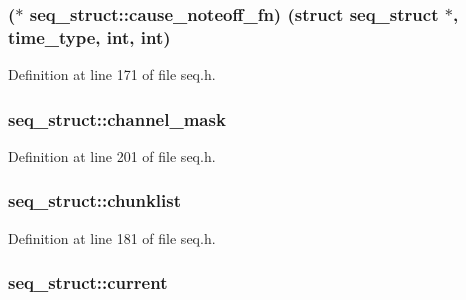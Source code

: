\subsubsection[{\texorpdfstring{cause\+\_\+noteoff\+\_\+fn}{cause_noteoff_fn}}]{($\ast$ seq\+\_\+struct\+::cause\+\_\+noteoff\+\_\+fn) (struct {\bf seq\+\_\+struct} $\ast$, {\bf time\+\_\+type}, {\bf int}, {\bf int})}\hypertarget{structseq__struct_aa7837b0e6a76089790b16bdd5f2e951b}{}\label{structseq__struct_aa7837b0e6a76089790b16bdd5f2e951b}


Definition at line 171 of file seq.\+h.

\subsubsection[{\texorpdfstring{channel\+\_\+mask}{channel_mask}}]{ seq\+\_\+struct\+::channel\+\_\+mask}\hypertarget{structseq__struct_a02261a8c27d06dbcc3c48639c0d95146}{}\label{structseq__struct_a02261a8c27d06dbcc3c48639c0d95146}


Definition at line 201 of file seq.\+h.

\subsubsection[{\texorpdfstring{chunklist}{chunklist}}]{ seq\+\_\+struct\+::chunklist}\hypertarget{structseq__struct_aeda222b5a2b5b9564099b14e8b69174b}{}\label{structseq__struct_aeda222b5a2b5b9564099b14e8b69174b}


Definition at line 181 of file seq.\+h.

\subsubsection[{\texorpdfstring{current}{current}}]{ seq\+\_\+struct\+::current}\hypertarget{structseq__struct_a495dae0328f5aeb24840005ecafd6906}{}\label{structseq__struct_a495dae0328f5aeb24840005ecafd6906}


